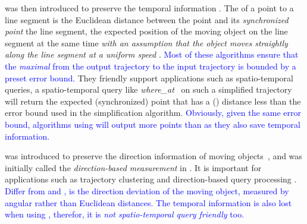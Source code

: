 { \sed was then introduced to preserve the temporal information \cite{Meratnia:Spatiotemporal,Cao:Spatio}. 
The \sed of a point to a line segment is the Euclidean distance between the point and its \emph{synchronized point} \wrt the line segment, the expected position of the moving object on the line segment at the same time \emph{with an assumption that the object moves straightly along the line segment at a uniform speed} \cite{Cao:Spatio}. \textcolor{blue}{Most of these algorithms ensure that the \emph{maximal} \sed from the output trajectory to the input trajectory is bounded by a preset error bound.} 
They friendly support applications such as spatio-temporal queries, \ie a spatio-temporal query like \emph{where\_at}~\cite{Cao:Spatio} on such a simplified trajectory will return the expected (synchronized) point that has a (\sed) distance less than the error bound used in the simplification algorithm.
\textcolor{blue}{Obviously, given the same error bound, algorithms using \sed will output more points than \ped as they also save temporal information.}
%



\dad was introduced to preserve the direction information of moving objects~\cite{Long:Direction, Zhang:Evaluation}, and was initially called the \emph{direction-based measurement} in \cite{Long:Direction}. 
It is important for applications such as trajectory clustering and direction-based query processing \cite{Long:Direction,Long:Mining}.
\textcolor{blue}{Differ from \ped and \sed, \dad is the direction deviation of the moving object, measured by angular rather than Euclidean distances.}
\textcolor{blue}{The temporal information is also lost when using \dad, therefor, it is \emph{not spatio-temporal query friendly} too.}



}
